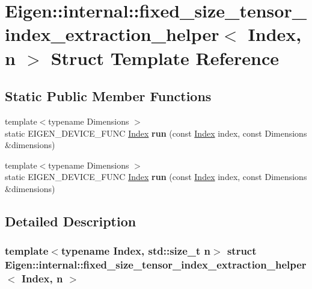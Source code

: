 \hypertarget{struct_eigen_1_1internal_1_1fixed__size__tensor__index__extraction__helper}{}\section{Eigen\+:\+:internal\+:\+:fixed\+\_\+size\+\_\+tensor\+\_\+index\+\_\+extraction\+\_\+helper$<$ Index, n $>$ Struct Template Reference}
\label{struct_eigen_1_1internal_1_1fixed__size__tensor__index__extraction__helper}
\subsection*{Static Public Member Functions}
\begin{DoxyCompactItemize}
\item 
\mbox{\label{struct_eigen_1_1internal_1_1fixed__size__tensor__index__extraction__helper_a30f1af04e0b30622b2244ef2d875b9e9}} 
{\footnotesize template$<$typename Dimensions $>$ }\\static E\+I\+G\+E\+N\+\_\+\+D\+E\+V\+I\+C\+E\+\_\+\+F\+U\+NC \hyperlink{namespace_eigen_a62e77e0933482dafde8fe197d9a2cfde}{Index} {\bfseries run} (const \hyperlink{namespace_eigen_a62e77e0933482dafde8fe197d9a2cfde}{Index} index, const Dimensions \&dimensions)
\item 
\mbox{\label{struct_eigen_1_1internal_1_1fixed__size__tensor__index__extraction__helper_a30f1af04e0b30622b2244ef2d875b9e9}} 
{\footnotesize template$<$typename Dimensions $>$ }\\static E\+I\+G\+E\+N\+\_\+\+D\+E\+V\+I\+C\+E\+\_\+\+F\+U\+NC \hyperlink{namespace_eigen_a62e77e0933482dafde8fe197d9a2cfde}{Index} {\bfseries run} (const \hyperlink{namespace_eigen_a62e77e0933482dafde8fe197d9a2cfde}{Index} index, const Dimensions \&dimensions)
\end{DoxyCompactItemize}


\subsection{Detailed Description}
\subsubsection*{template$<$typename Index, std\+::size\+\_\+t n$>$\newline
struct Eigen\+::internal\+::fixed\+\_\+size\+\_\+tensor\+\_\+index\+\_\+extraction\+\_\+helper$<$ Index, n $>$}



